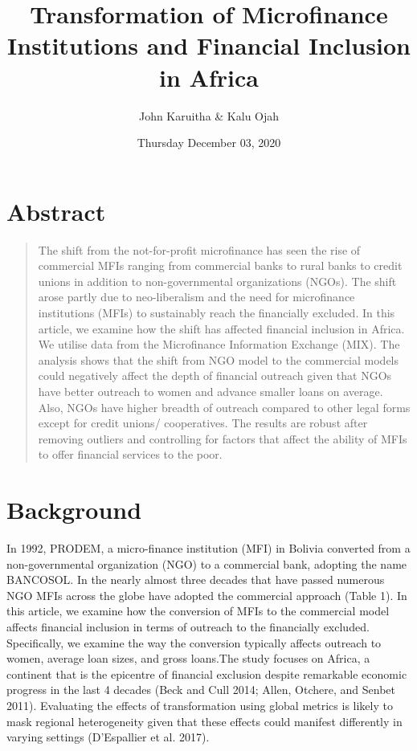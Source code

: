 \documentclass[
]{article}
\title{Transformation of Microfinance Institutions and Financial
Inclusion in Africa}
\author{John Karuitha \& Kalu Ojah}
\date{Thursday December 03, 2020}
\begin{document}
\maketitle

{
\setcounter{tocdepth}{2}
\tableofcontents
}
\hypertarget{abstract}{%
\section{\texorpdfstring{\textbf{Abstract}}{Abstract}}\label{abstract}}

\begin{quote}
The shift from the not-for-profit microfinance has seen the rise of
commercial MFIs ranging from commercial banks to rural banks to credit
unions in addition to non-governmental organizations (NGOs). The shift
arose partly due to neo-liberalism and the need for microfinance
institutions (MFIs) to sustainably reach the financially excluded. In
this article, we examine how the shift has affected financial inclusion
in Africa. We utilise data from the Microfinance Information Exchange
(MIX). The analysis shows that the shift from NGO model to the
commercial models could negatively affect the depth of financial
outreach given that NGOs have better outreach to women and advance
smaller loans on average. Also, NGOs have higher breadth of outreach
compared to other legal forms except for credit unions/ cooperatives.
The results are robust after removing outliers and controlling for
factors that affect the ability of MFIs to offer financial services to
the poor.
\end{quote}

\hypertarget{background}{%
\section{\texorpdfstring{\textbf{Background}}{Background}}\label{background}}

In 1992, PRODEM, a micro-finance institution (MFI) in Bolivia converted
from a non-governmental organization (NGO) to a commercial bank,
adopting the name BANCOSOL. In the nearly almost three decades that have
passed numerous NGO MFIs across the globe have adopted the commercial
approach (Table 1). In this article, we examine how the conversion of
MFIs to the commercial model affects financial inclusion in terms of
outreach to the financially excluded. Specifically, we examine the way
the conversion typically affects outreach to women, average loan sizes,
and gross loans.The study focuses on Africa, a continent that is the
epicentre of financial exclusion despite remarkable economic progress in
the last 4 decades (Beck and Cull 2014; Allen, Otchere, and Senbet
2011). Evaluating the effects of transformation using global metrics is
likely to mask regional heterogeneity given that these effects could
manifest differently in varying settings (D'Espallier et al. 2017).
\end{document}
